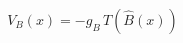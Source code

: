 \documentclass{article}
\begin{document}
\begin{equation*}
V_B(x)=-g_B\,T\!\left(\widehat B(x)\right)
\end{equation*}
\end{document}

